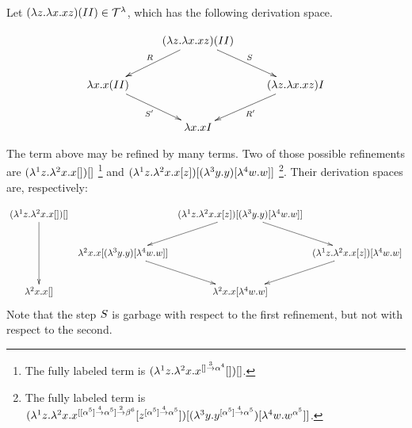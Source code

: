 \begin{example}
Let $(\lambda z. \lambda x. x z) (I I) \in \mathcal{T}^{\lambda}$,
which has the following derivation space.

\[
\xymatrix{
  & (\lam{\varthree}{\lam{\var}{\var \varthree}}) (I I) \ar[dl]_{\redex} \ar[dr]^{\redextwo}
  &
  \\
  \lam{\var}{\var (I I)} \ar[dr]_{\redextwo'}
  &
  & (\lam{\varthree}{\lam{\var}{\var \varthree}}) I \ar[dl]^{\redex'}
  \\
  & \lam{\var}{\var I}
  &
  \\
}
\]

The term above may be refined by many terms. Two of those possible refinements are
$(\lambda^{1} z. \lambda^{2} x. x []) []$
\footnote{
The fully labeled term is
$(\lambda^{1} z. \lambda^{2} x. x^{[] \overset{3}{\to} \alpha^4} []) []$.
}
and
$(\lambda^{1} z. \lambda^{2} x. x [z]) [(\lambda^{3} y. y) [\lambda^{4} w. w]]$
\footnote{
The fully labeled term is
$(\lambda^{1} z. 
   \lambda^{2} x. 
     x^{[[\alpha^5] \overset{4}{\to} \alpha^5] \overset{2}{\to} \beta^6}
     [z^{[\alpha^5] \overset{4}{\to} \alpha^5}]
  )
  [(\lambda^{3} y. y^{[\alpha^5] \overset{4}{\to} \alpha^5}) [\lambda^{4} w. w^{\alpha^5}]]$.
}.
Their derivation spaces are, respectively:

{\small
\[
\xymatrix@C=.15cm{
  (\lamp{1}{\varthree}{\lamp{2}{\var}{\var []}}) []
  \ar[dd]
  &
  & (\lamp{1}{\varthree}{\lamp{2}{\var}{\var [\varthree]}}) [(\lamp{3}{\vartwo}{\vartwo}) [\lamp{4}{w}{w}]]
  \ar[dl]
  \ar[dr]
  &
  \\
  & \lamp{2}{\var}{\var [(\lamp{3}{\vartwo}{\vartwo}) [\lamp{4}{w}{w}]]}
  \ar[dr]
  &
  & (\lamp{1}{\varthree}{\lamp{2}{\var}{\var [\varthree]}}) [\lamp{4}{w}{w}]
  \ar[dl]
  \\
  \lamp{2}{\var}{\var []}
  &
  & \lamp{2}{\var}{\var [\lamp{4}{w}{w}]}
  &
  \\
}
\]
}
Note that the step $S$ is garbage with respect to the first refinement,
but not with respect to the second.
\end{example}

